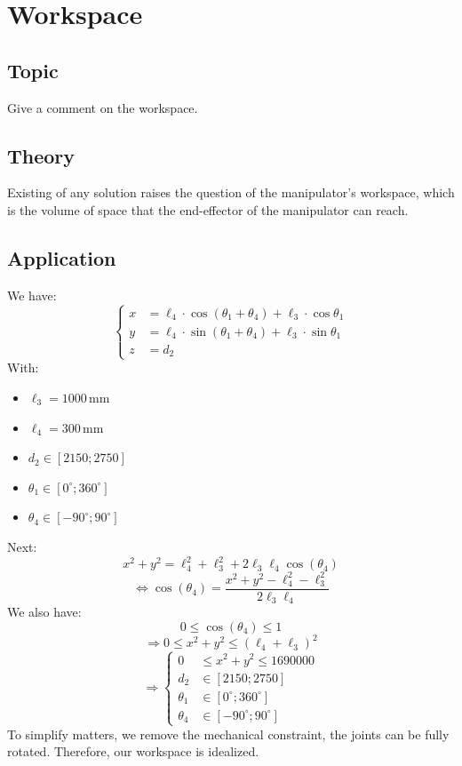 \chapter{Workspace}
\section{Topic}
Give a comment on the workspace.
\section{Theory}
Existing of any solution raises the question of the manipulator's workspace, which is the volume of space that the end-effector of the manipulator can reach.
\section{Application}
We have: 
\[
\left\{
\begin{aligned}
x &= \ell_4 \cdot \cos(\theta_1 + \theta_4) + \ell_3 \cdot \cos\theta_1 \\
y &= \ell_4 \cdot \sin(\theta_1 + \theta_4) + \ell_3 \cdot \sin\theta_1 \\
z &= d_2
\end{aligned}
\right.
\]
With:
\begin{itemize}
    \item $\ell_3 = 1000\,\text{mm}$
    \item $\ell_4 = 300\,\text{mm}$
    \item $d_2 \in [2150; 2750]$
    \item $\theta_1 \in [0^\circ; 360^\circ]$
    \item $\theta_4 \in [-90^\circ; 90^\circ]$
\end{itemize}
Next:
\[
    x^2 + y^2 = \ell_4^2 + \ell_3^2 + 2\ell_3 \ell_4 \cos(\theta_4)
\]
\[
    \Leftrightarrow \cos(\theta_4) = \frac{x^2 + y^2 - \ell_4^2 - \ell_3^2}{2 \ell_3 \ell_4}
\]
We also have:
\[
    0 \leq \cos(\theta_4) \leq 1
\]
\[
    \Rightarrow 0 \leq x^2 + y^2 \leq (\ell_4 + \ell_3)^2
\]
\[
\Rightarrow 
\left\{
\begin{aligned}
0 &\leq x^2 + y^2 \leq 1690000 \\
d_2 &\in [2150; 2750] \\
\theta_1 &\in [0^\circ; 360^\circ] \\
\theta_4 &\in [-90^\circ; 90^\circ]
\end{aligned}
\right.
\]
To simplify matters, we remove the mechanical constraint, the joints can be fully rotated. Therefore, our workspace is idealized.
